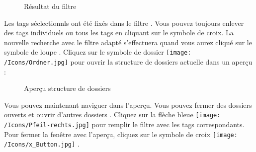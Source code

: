 \begin{figure}[H]
\caption{Résultat du filtre}
\end{figure}

Les tags séclectionnls ont été fixés dans le filtre . Vous pouvez toujours enlever des tags individuels ou tous les tags en cliquant sur le symbole de croix. La nouvelle recherche avec le filtre adapté s'effectuera quand vous aurez cliqué sur le symbole de loupe . Cliquez sur le symbole de dossier \texttt{[image: /Icons/Ordner.jpg]}  pour ouvrir la structure de dossiers actuelle dans un aperçu : 

\begin{figure}[H]
\caption{Aperçu structure de dossiers}
\end{figure}

Vous pouvez maintenant naviguer dans l'aperçu. Vous pouvez fermer des dossiers ouverts  et ouvrir d'autres dossiers . Cliquez sur la flèche bleue \texttt{[image: /Icons/Pfeil-rechts.jpg]}  pour remplir le filtre avec les tags correspondants. Pour fermer la fenêtre avec l'aperçu, cliquez sur le symbole de croix \texttt{[image: /Icons/x\_Button.jpg]} .


